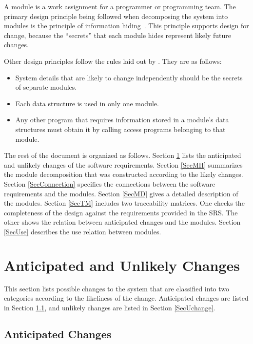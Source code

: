 \documentclass[12pt, titlepage]{article}
\begin{document}
A module is a work assignment for a programmer or programming team\citep{ParnasEtAl1984}. The primary design principle being followed when decomposing the system into modules is the principle of information hiding~\citep{Parnas1972a}. This principle supports design for change, because the ``secrets'' that each module hides represent likely future changes.

Other design principles follow the rules laid out by \citet{ParnasEtAl1984}. They are as follows:
\begin{itemize}
\item System details that are likely to change independently should be the
  secrets of separate modules.
\item Each data structure is used in only one module.
\item Any other program that requires information stored in a module's data
  structures must obtain it by calling access programs belonging to that module.
\end{itemize}

The rest of the document is organized as follows. Section
\ref{SecChange} lists the anticipated and unlikely changes of the software
requirements. Section \ref{SecMH} summarizes the module decomposition that
was constructed according to the likely changes. Section \ref{SecConnection}
specifies the connections between the software requirements and the
modules. Section \ref{SecMD} gives a detailed description of the
modules. Section \ref{SecTM} includes two traceability matrices. One checks
the completeness of the design against the requirements provided in the SRS. The
other shows the relation between anticipated changes and the modules. Section
\ref{SecUse} describes the use relation between modules.

\section{Anticipated and Unlikely Changes} \label{SecChange}

This section lists possible changes to the system that are classified into two
categories according to the likeliness of the change. Anticipated changes are 
listed in Section \ref{SecAchange}, and unlikely changes are listed in Section \ref{SecUchange}.

\subsection{Anticipated Changes} \label{SecAchange}
\end{document}
